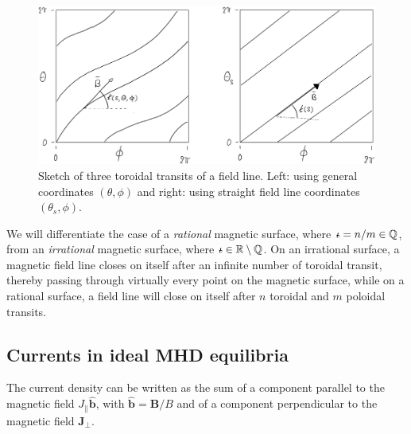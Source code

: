 \documentclass[my_thesis.tex]{subfiles}
\begin{document}
\begin{figure}
	\centering
	\includegraphics[width=\linewidth]{images/SketchFieldLine-crop.pdf}
	\caption{Sketch of three toroidal transits of a field line. Left: using general coordinates $(\theta,\phi)$ and right: using straight field line coordinates $(\theta_s,\phi)$.}
	\label{fig sketch field line}
\end{figure}

We will differentiate the case of a \emph{rational} magnetic surface, where $\text{$\iota\!\!$-}=n/m\in\mathbb{Q}$, from an \emph{irrational} magnetic surface, where $\text{$\iota\!\!$-}\in\mathbb{R}\setminus\mathbb{Q}$. On an irrational surface, a magnetic field line closes on itself after an infinite number of toroidal transit, thereby passing through virtually every point on the magnetic surface, while on a rational surface, a field line will close on itself after $n$ toroidal and $m$ poloidal transits.



\subsection{Currents in ideal MHD equilibria}\label{sec ideal mhd currents}
The current density can be written as the sum of a component parallel to the magnetic field $J_\parallel \hat{\mathbf{b}}$, with $\hat{\mathbf{b}}=\mathbf{B}/B$ and of a component perpendicular to the magnetic field $\mathbf{J}_\perp$.
\end{document}
